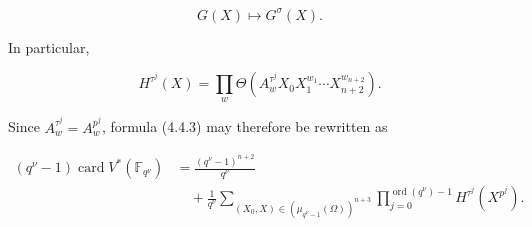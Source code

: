 \begin{equation}\tag{4.4.5}
G(X)\longmapsto G^\sigma(X).
\end{equation}

In particular,

\[
H^{\tau^j}(X)=\prod_w
\Theta\!\left(A_w^{\tau^j}X_0X_1^{w_1}\cdots
X_{n+2}^{w_{n+2}}\right).
\]

Since $A_w^{\tau^j}=A_w^{p^j}$, formula (4.4.3) may therefore be rewritten
as

\begin{equation}\tag{4.4.6}
\begin{aligned}
(q^\nu-1)\operatorname{card}V^*(\mathbb F_{q^\nu})
&=\frac{(q^\nu-1)^{n+2}}{q^\nu}\\
&\quad+\frac1{q^\nu}
\sum_{(X_0,X)\in(\mu_{q^\nu-1}(\Omega))^{n+3}}
\prod_{j=0}^{\operatorname{ord}(q^\nu)-1}H^{\tau^j}(X^{p^j}).
\end{aligned}
\end{equation}
